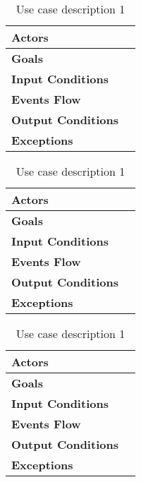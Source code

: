 

\begin{table}[H]
	\centering
	\caption{Use case description 1}
	\label{sect:uml:usecases:tab1}
	\def\arraystretch{1.5}
	\begin{tabular}{|p{7cm}|p{7cm}|}
		\hline
		\textbf{Actors}            & 		    \\ \hline
		\textbf{Goals}             &            \\ \hline
		\textbf{Input Conditions}  &            \\ \hline
		\textbf{Events Flow}       &            \\ \hline
		\textbf{Output Conditions} &            \\ \hline
		\textbf{Exceptions}        &            \\ \hline
	\end{tabular}
\end{table}

\begin{table}[H]
	\centering
	\caption{Use case description 1}
	\label{sect:uml:usecases:tab1}
	\def\arraystretch{1.5}
	\begin{tabular}{|p{7cm}|p{7cm}|}
		\hline
		\textbf{Actors}            & 		    \\ \hline
		\textbf{Goals}             &            \\ \hline
		\textbf{Input Conditions}  &            \\ \hline
		\textbf{Events Flow}       &            \\ \hline
		\textbf{Output Conditions} &            \\ \hline
		\textbf{Exceptions}        &            \\ \hline
	\end{tabular}
\end{table}

\begin{table}[H]
	\centering
	\caption{Use case description 1}
	\label{sect:uml:usecases:tab1}
	\def\arraystretch{1.5}
	\begin{tabular}{|p{7cm}|p{7cm}|}
		\hline
		\textbf{Actors}            & 		    \\ \hline
		\textbf{Goals}             &            \\ \hline
		\textbf{Input Conditions}  &            \\ \hline
		\textbf{Events Flow}       &            \\ \hline
		\textbf{Output Conditions} &            \\ \hline
		\textbf{Exceptions}        &            \\ \hline
	\end{tabular}
\end{table}